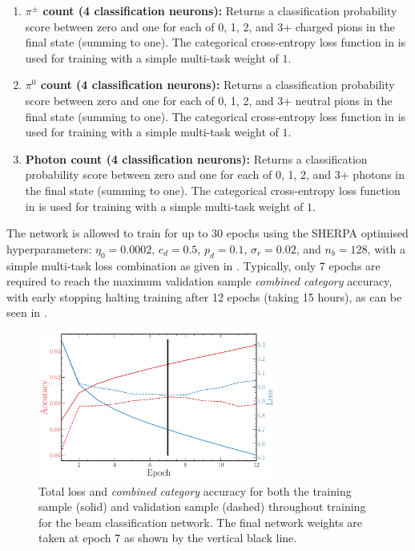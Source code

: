 \begin{enumerate}
          (summing to one). The categorical cross-entropy loss function in
           is used for training with a simple multi-task
          weight of $1$.
    \item \textbf{$\pi^{\pm}$ count (4 classification neurons):} Returns a classification
          probability score between zero and one for each of 0, 1, 2, and 3+ charged pions in the
          final state (summing to one). The categorical cross-entropy loss function in
           is used for training with a simple multi-task
          weight of $1$.
    \item \textbf{$\pi^{0}$ count (4 classification neurons):} Returns a classification
          probability score between zero and one for each of 0, 1, 2, and 3+ neutral pions in the
          final state (summing to one). The categorical cross-entropy loss function in
           is used for training with a simple multi-task
          weight of $1$.
    \item \textbf{Photon count (4 classification neurons):} Returns a classification probability
          score between zero and one for each of 0, 1, 2, and 3+ photons in the final state
          (summing to one). The categorical cross-entropy loss function in
           is used for training with a simple multi-task
          weight of $1$.
\end{enumerate}

The network is allowed to train for up to 30 epochs using the SHERPA optimised hyperparameters:
$\eta_{0}=0.0002$, $c_{d}=0.5$, $p_{d}=0.1$, $\sigma_{r}=0.02$, and $n_{b}=128$, with a simple
multi-task loss combination as given in . Typically, only 7 epochs
are required to reach the maximum validation sample \emph{combined category} accuracy, with early
stopping halting training after 12 epochs (taking 15 hours), as can be seen in
.

\begin{figure} %
    \includegraphics[width=0.7\textwidth]{diagrams/7-results/final_beam_history.pdf}
    \caption[Loss and accuracy throughout training for the beam classification network]
    {Total loss and \emph{combined category} accuracy for both the training sample (solid) and
        validation sample (dashed) throughout training for the beam classification network. The
        final network weights are taken at epoch 7 as shown by the vertical black line.}
    \label{fig:final_beam_history}
\end{figure}

